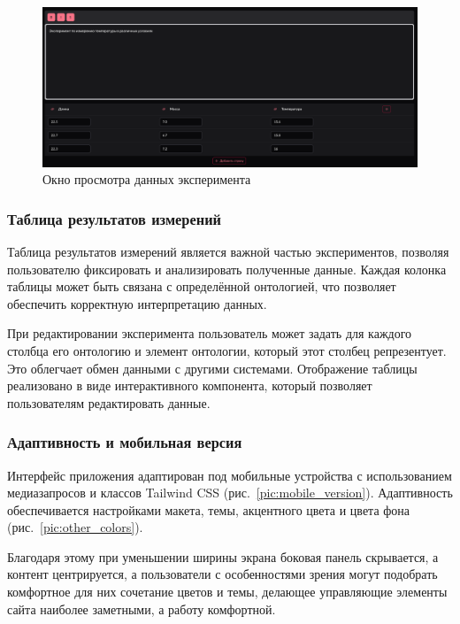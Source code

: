 \begin{figure}[H]
\centering
\includegraphics[width=\linewidth]{img/experiment_view.png}
\caption{Окно просмотра данных эксперимента}
\label{pic:lab_experiment_editor}
\end{figure}
\vspace{0.5cm}

\subsubsection{Таблица результатов измерений}

Таблица результатов измерений является важной частью экспериментов, позволяя пользователю фиксировать и анализировать полученные данные.
Каждая колонка таблицы может быть связана с определённой онтологией, что позволяет обеспечить корректную интерпретацию данных.

При редактировании эксперимента пользователь может задать для каждого столбца его онтологию и элемент онтологии, который этот столбец репрезентует.
Это облегчает обмен данными с другими системами.
Отображение таблицы реализовано в виде интерактивного компонента, который позволяет пользователям редактировать данные.

\subsubsection{Адаптивность и мобильная версия}

Интерфейс приложения адаптирован под мобильные устройства с использованием медиазапросов и классов Tailwind CSS (рис.~\ref{pic:mobile_version}).
Адаптивность обеспечивается настройками макета, темы, акцентного цвета и цвета фона (рис.~\ref{pic:other_colors}).

Благодаря этому при уменьшении ширины экрана боковая панель скрывается, а контент центрируется, а пользователи с особенностями зрения могут подобрать комфортное для них сочетание цветов и темы, делающее управляющие элементы сайта наиболее заметными, а работу комфортной.

